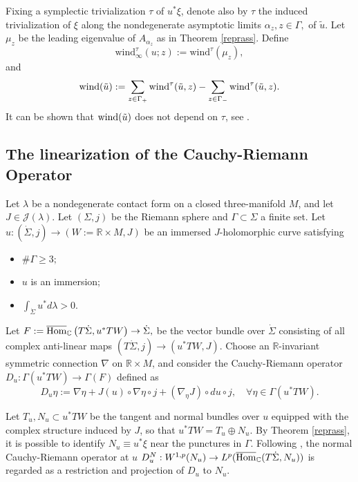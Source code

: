 \documentclass{amsart}
\newcommand{\C}{\mathbb{C}}
\newcommand{\R}{\mathbb{R}}
\newcommand{\wind}{\text{wind}^{\tau}}
\begin{document}
Fixing a symplectic trivialization $\tau$ of $u^*\xi$, denote also by $\tau$ the induced trivialization of $\xi$ along the nondegenerate asymptotic limits $\alpha_z, z\in \Gamma,$ of $\tilde u$. Let $\mu_z$ be the leading eigenvalue  of $A_{\alpha_z}$ as in Theorem \ref{reprass}. Define
\begin{equation}
\wind_{\infty}(u;z):=\wind(\mu_z),
\label{eq:windinfty}
\end{equation}
and
$$
{\rm wind}(\tilde u):= \sum_{z\in \Gamma_+} \wind(\tilde u,z) - \sum_{z\in \Gamma_-} \wind(\tilde u,z).
$$
It can be shown that ${\rm wind}(\tilde u)$ does not depend on $\tau$, see \cite{prop2}. 




\subsection{The linearization of the Cauchy-Riemann Operator}\label{sec_linear}

Let $\lambda$ be a nondegenerate contact form on a closed three-manifold $M$, and let $J \in \mathcal{J}(\lambda)$. Let $(\Sigma,j)$ be the Riemann sphere and $\Gamma \subset \Sigma$ a finite set. Let $u:(\dot{\Sigma},j) \to (W:=\R \times M, J)$ be an immersed $J$-holomorphic curve satisfying
\begin{itemize}
     \item[(i)] $\#\Gamma \geq 3;$
     \item[(ii)] $u$ is an immersion;
    \item[(iii)] $\int_{\dot \Sigma} u^* d\lambda >0$. 
   
\end{itemize}


Let 
$
F:=\overline{\rm Hom}_{\C}\left(T\dot{\Sigma},u^*TW\right) \to \dot{\Sigma},
$ 
be the vector bundle over $\dot \Sigma$ consisting of all complex anti-linear maps $(T\dot{\Sigma},j) \to (u^*TW,J)$. Choose an $\R$-invariant symmetric connection $\nabla$ on $\R \times M$, and
consider the Cauchy-Riemann operator
$D_u: \Gamma(u^*TW) \to \Gamma(F)$
 defined as
\begin{equation}\label{eq:opDu}
     D_u \eta:=\nabla \eta + J(u) \circ \nabla \eta \circ j + (\nabla_\eta J)\circ du \circ j, \quad \forall \eta \in \Gamma(u^*TW).  
\end{equation}


Let $T_u,N_u \subset u^*TW$ be the tangent and normal bundles over $u$ equipped with the complex structure induced by $J$, so that
$
u^*TW = T_u \oplus N_u.
$
By Theorem \ref{reprass}, it is possible to identify $N_u\equiv u^*\xi$ near the punctures in $\Gamma$.
Following \cite{W10}, the normal Cauchy-Riemann operator at $u$
$
D_u^N:W^{1,p}(N_u)  \to L^p(\overline{\rm Hom}_{\C}(T\dot{\Sigma},N_u))$
is regarded as a restriction and projection of $D_u$ to $N_u$.
\end{document}
